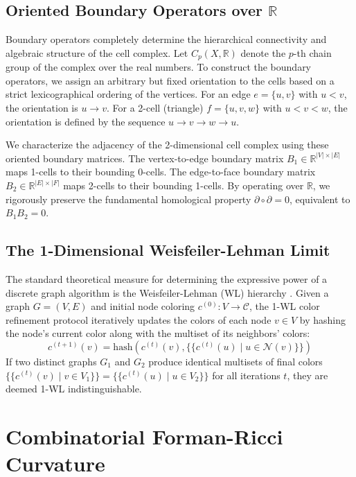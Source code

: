 \documentclass[11pt, letterpaper]{article}
\begin{document}
\subsection{Oriented Boundary Operators over \(\mathbb{R}\)}
Boundary operators completely determine the hierarchical connectivity and algebraic structure of the cell complex. Let $C_p(X, \mathbb{R})$ denote the $p$-th chain group of the complex over the real numbers. To construct the boundary operators, we assign an arbitrary but fixed orientation to the cells based on a strict lexicographical ordering of the vertices. For an edge $e = \{u, v\}$ with $u < v$, the orientation is $u \to v$. For a 2-cell (triangle) $f = \{u, v, w\}$ with $u < v < w$, the orientation is defined by the sequence $u \to v \to w \to u$.

We characterize the adjacency of the 2-dimensional cell complex using these oriented boundary matrices. The vertex-to-edge boundary matrix $B_{1} \in \mathbb{R}^{|V|\times|E|}$ maps 1-cells to their bounding 0-cells. The edge-to-face boundary matrix $B_{2} \in \mathbb{R}^{|E|\times|F|}$ maps 2-cells to their bounding 1-cells. By operating over $\mathbb{R}$, we rigorously preserve the fundamental homological property $\partial \circ \partial = 0$, equivalent to $B_1 B_2 = 0$.

\subsection{The 1-Dimensional Weisfeiler-Lehman Limit}
The standard theoretical measure for determining the expressive power of a discrete graph algorithm is the Weisfeiler-Lehman (WL) hierarchy \cite{wl_original}. Given a graph $G=(V,E)$ and initial node coloring $c^{(0)}: V \to \mathcal{C}$, the 1-WL color refinement protocol iteratively updates the colors of each node $v \in V$ by hashing the node's current color along with the multiset of its neighbors' colors:
\begin{equation}
    c^{(t+1)}(v) = \text{hash}\left(c^{(t)}(v), \{\!\{ c^{(t)}(u) \mid u \in \mathcal{N}(v) \}\!\}\right)
\end{equation}
If two distinct graphs $G_{1}$ and $G_{2}$ produce identical multisets of final colors $\{\!\{ c^{(t)}(v) \mid v \in V_1 \}\!\} = \{\!\{ c^{(t)}(u) \mid u \in V_2 \}\!\}$ for all iterations $t$, they are deemed 1-WL indistinguishable. 

\section{Combinatorial Forman-Ricci Curvature}
\end{document}
